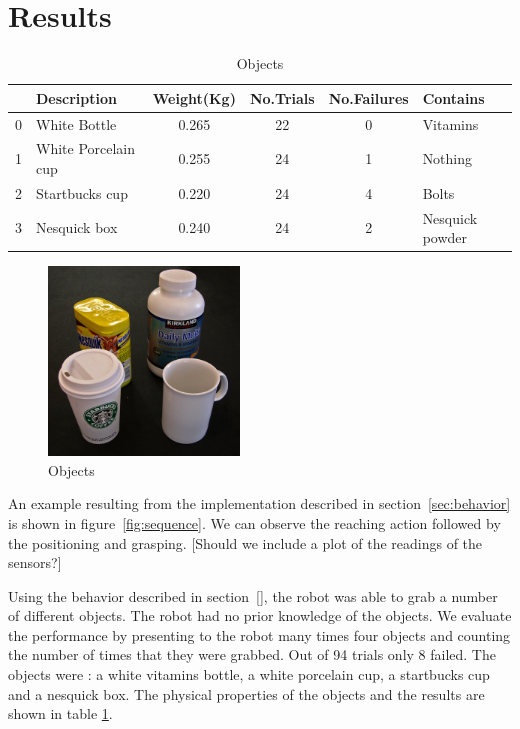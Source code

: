 \section{Results}
\label{sec:results}

\begin{table}[tb]
  \caption{Objects} \label{tab:objects} \centering
  \begin{tabular}{|c|l|c|c|c|l|}
    \hline
    &Description& Weight(Kg)&No.Trials&No.Failures&Contains \\
    \hline
    0&White Bottle        & 0.265 & 22& 0 & Vitamins\\
    1&White Porcelain cup & 0.255 & 24& 1 & Nothing\\
    2&Startbucks cup      & 0.220 & 24& 4 & Bolts \\
    3&Nesquick box        & 0.240 & 24& 2 & Nesquick powder\\

    \hline
  \end{tabular}
\end{table}

\begin{figure}[tbp]
\centerline{
\includegraphics[width=2.0in]{./figures/objects.eps}
}\caption{Objects}
\label{fig:Objects}
\end{figure}

An example resulting from the implementation described in
section~\ref{sec:behavior} is shown in figure~\ref{fig:sequence}.
We can observe the reaching action followed by the positioning and
grasping. [Should we include a plot of the readings of the
sensors?]


Using the behavior described in section~\ref{}, the robot was able
to grab a number of different objects. The robot had no prior
knowledge of the objects. We evaluate the performance by
presenting to the robot many times four objects and counting the
number of times that they were grabbed. Out of 94 trials only 8
failed. The objects were : a white vitamins bottle, a white
porcelain cup, a startbucks cup and a nesquick box. The physical
properties of the objects and the results are shown in table
\ref{tab:objects}.

